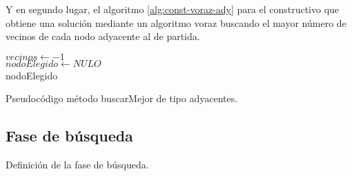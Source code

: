 Y en segundo lugar, el algoritmo \ref{alg:const-voraz-ady} para el constructivo que obtiene una solución mediante un algoritmo voraz buscando el mayor número de vecinos de cada nodo adyacente al de partida.\\
\begin{algorithm}
	$ vecinos \gets -1 $ \\[0.2cm]
	$ nodoElegido \gets NULO $ \\[0.2cm]
	\Return nodoElegido
	\caption{Pseudocódigo método buscarMejor de tipo adyacentes.}
	\label{alg:const-voraz-ady}
\end{algorithm}

\subsection{Fase de búsqueda}
Definición de la fase de búsqueda.



